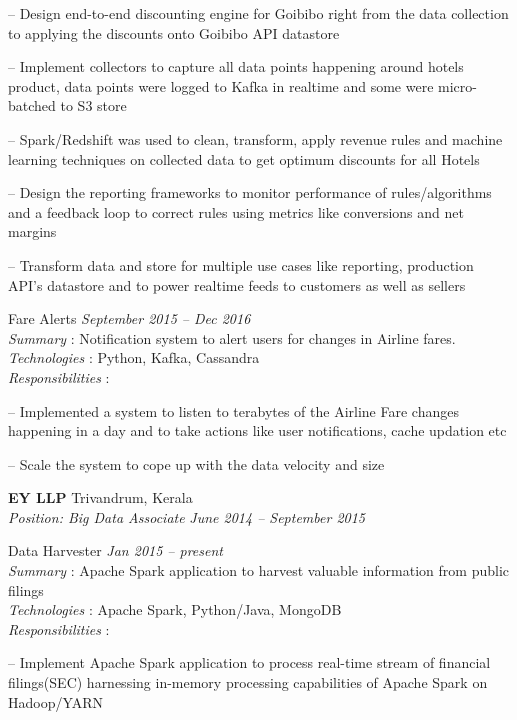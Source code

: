 \documentclass[margin,line]{resume}
\begin{document}
\begin{resume}
\begin{list2}
\item[--] Design end-to-end discounting engine for Goibibo right from the data collection to applying the discounts onto Goibibo API datastore
\item[--] Implement collectors to capture all data points happening around hotels product, data points were logged to Kafka in realtime and some were micro-batched to S3 store
\item[--] Spark/Redshift was used to clean, transform, apply revenue rules and machine learning techniques on collected data to get optimum discounts for all Hotels
\item[--] Design the reporting frameworks to monitor performance of rules/algorithms and a feedback loop to correct rules using metrics like conversions and net margins
\item[--] Transform data and store for multiple use cases like reporting, production API's datastore and to power realtime feeds to customers as well as sellers
\end{list2}
	
Fare Alerts				 \hfill  \textit{September 2015 -- Dec 2016} \\ 
\textit{Summary} : Notification system to alert users for changes in Airline fares. \\
      \textit{Technologies} : Python, Kafka, Cassandra\\
      \textit{Responsibilities} : 
     	 	\begin{list2}
\item[--] Implemented a system to listen to terabytes of the Airline Fare changes happening in a day and to take actions like user notifications, cache updation etc
\item[--] Scale the system to cope up with the data velocity and size

\end{list2}

    \textbf{EY LLP } 				\hfill  Trivandrum, Kerala \\
      \textit{Position: Big Data Associate } 			\hfill \textit{June 2014 -- September 2015}
  

Data Harvester				 				\hfill \textit{Jan 2015 -- present} \\ 
\textit{Summary} : Apache Spark application to harvest valuable information from public filings \\
      \textit{Technologies} : Apache Spark, Python/Java, MongoDB\\
\textit{Responsibilities} : 
     	 	\begin{list2}
\item[--]Implement Apache Spark application to process real-time stream of financial filings(SEC) harnessing 
 in-memory processing capabilities of Apache Spark on Hadoop/YARN
	\end{list2}


\end{resume}
\end{document}
